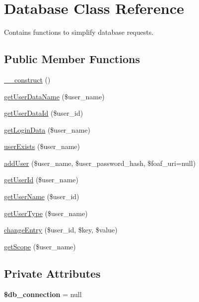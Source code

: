 \hypertarget{class_database}{\section{\-Database \-Class \-Reference}
\label{class_database}
}


\-Contains functions to simplify database requests.  


\subsection*{\-Public \-Member \-Functions}
\begin{DoxyCompactItemize}
\item 
\hyperlink{class_database_a095c5d389db211932136b53f25f39685}{\-\_\-\-\_\-construct} ()
\item 
\hyperlink{class_database_a6d8491e0ba1fbe82bbddba3ff5c79468}{get\-User\-Data\-Name} (\$user\-\_\-name)
\item 
\hyperlink{class_database_a6a4a26a4c1f8f44c1f92c240d22c9e03}{get\-User\-Data\-Id} (\$user\-\_\-id)
\item 
\hyperlink{class_database_ad4ce3b281c838afb8f9bb32eaef13188}{get\-Login\-Data} (\$user\-\_\-name)
\item 
\hyperlink{class_database_adfae8c2fdb28633a9ba04e22ea4015c2}{user\-Exists} (\$user\-\_\-name)
\item 
\hyperlink{class_database_a68c8ec601030eabdf057edf4f0cacc58}{add\-User} (\$user\-\_\-name, \$user\-\_\-password\-\_\-hash, \$foaf\-\_\-uri=null)
\item 
\hyperlink{class_database_a729c83344241bddb181c838752a72bbe}{get\-User\-Id} (\$user\-\_\-name)
\item 
\hyperlink{class_database_a9f38c4f4c814e665fc08326a61d4bbb4}{get\-User\-Name} (\$user\-\_\-id)
\item 
\hyperlink{class_database_a35fbecead028c4fa940d0e39a565c137}{get\-User\-Type} (\$user\-\_\-name)
\item 
\hyperlink{class_database_a50dc4c9632a213cd75857e0ea46b79ae}{change\-Entry} (\$user\-\_\-id, \$key, \$value)
\item 
\hyperlink{class_database_ad84e4a2f075fb7fff0aba51ee7db413e}{get\-Scope} (\$user\-\_\-name)
\end{DoxyCompactItemize}
\subsection*{\-Private \-Attributes}
\begin{DoxyCompactItemize}
\item 
\hypertarget{class_database_af908e1ef16f0db5f47519cb83b633e96}{{\bfseries \$db\-\_\-connection} = null}\label{class_database_af908e1ef16f0db5f47519cb83b633e96}

\end{DoxyCompactItemize}


